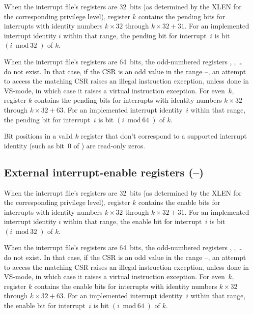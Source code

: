 When the interrupt file's registers are 32~bits (as determined by
the XLEN for the corresponding privilege level), register $k$
contains the pending bits for interrupts with identity numbers
$k\times\mbox{32}$ through ${k\times\mbox{32} + \mbox{31}}$.
For an implemented interrupt identity $i$ within that range, the
pending bit for interrupt~$i$ is bit $(i\bmod\mbox{32})$ of $k$.

When the interrupt file's registers are 64~bits, the odd-numbered
registers , , \dots {} do not exist.
In that case, if the  CSR is an odd value in the range
--, an attempt to access the matching  CSR
raises an illegal instruction exception, unless done in VS-mode, in
which case it raises a virtual instruction exception.
For even~$k$, register $k$ contains the pending bits
for interrupts with identity numbers $k\times\mbox{32}$ through
${k\times\mbox{32} + \mbox{63}}$.
For an implemented interrupt identity~$i$ within that range, the
pending bit for interrupt~$i$ is bit $(i\bmod\mbox{64})$ of $k$.

Bit positions in a valid $k$ register that don't correspond
to a supported interrupt identity (such as bit~0 of ) are
read-only zeros.

\subsection{External interrupt-enable registers (--)}

When the interrupt file's registers are 32~bits (as determined by
the XLEN for the corresponding privilege level), register $k$
contains the enable bits for interrupts with identity numbers
$k\times\mbox{32}$ through ${k\times\mbox{32} + \mbox{31}}$.
For an implemented interrupt identity $i$ within that range, the enable
bit for interrupt~$i$ is bit $(i\bmod\mbox{32})$ of $k$.

When the interrupt file's registers are 64~bits, the odd-numbered
registers , , \dots {} do not exist.
In that case, if the  CSR is an odd value in the range
--, an attempt to access the matching  CSR
raises an illegal instruction exception, unless done in VS-mode, in
which case it raises a virtual instruction exception.
For even~$k$, register $k$ contains the enable bits for
interrupts with identity numbers $k\times\mbox{32}$ through
${k\times\mbox{32} + \mbox{63}}$.
For an implemented interrupt identity~$i$ within that range, the enable
bit for interrupt~$i$ is bit $(i\bmod\mbox{64})$ of $k$.

